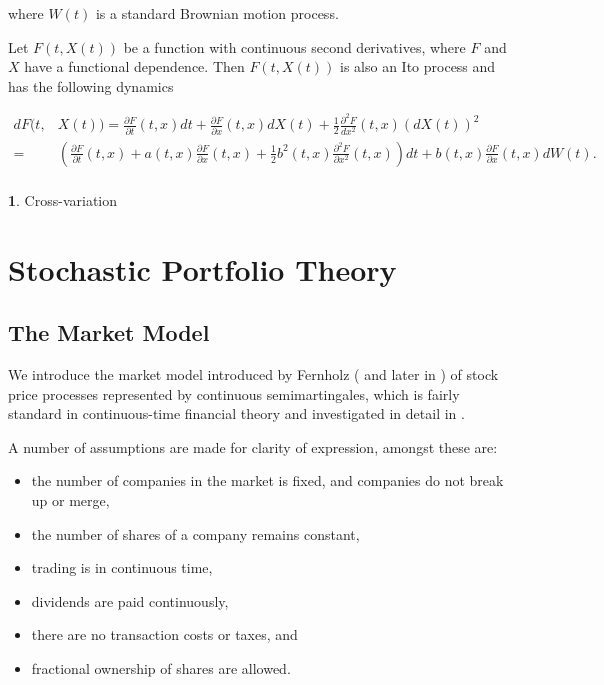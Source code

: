 \documentclass[british]{amsart} \usepackage{lmodern}
\numberwithin{equation}{section} \numberwithin{figure}{section}
\theoremstyle{plain} \newtheorem{thm}{\protect\theoremname}[section]
\theoremstyle{definition} \newtheorem{defn}[thm]{\protect\definitionname}
\theoremstyle{plain} \newtheorem{assumption}[thm]{\protect\assumptionname}
\theoremstyle{plain} \newtheorem{lem}[thm]{\protect\lemmaname}
\theoremstyle{plain} \newtheorem{prop}[thm]{\protect\propositionname}
\theoremstyle{remark} \newtheorem{rem}[thm]{\protect\remarkname}
\theoremstyle{plain} \newtheorem{cor}[thm]{\protect\corollaryname}
\begin{document}
where $W(t)$ is a standard Brownian motion process.

Let $F(t,X(t))$ be a function with continuous second derivatives,
where $F$ and $X$ have a functional dependence. Then $F(t,X(t))$
is also an Ito process and has the following dynamics

\begin{align*}
dF(t, & X(t))=\frac{\partial F}{\partial t}(t,x)dt+\frac{\partial F}{\partial x}(t,x)dX(t)+\frac{1}{2}\frac{\partial^{2}F}{dx^{2}}(t,x)(dX(t))^{2}\\
= & \left(\frac{\partial F}{\partial t}(t,x)+a(t,x)\frac{\partial F}{\partial x}(t,x)+\frac{1}{2}b^{2}(t,x)\frac{\partial^{2}F}{\partial x^{2}}(t,x)\right)dt+b(t,x)\frac{\partial F}{\partial x}(t,x)dW(t).\\
\end{align*}

\begin{defn}
Cross-variation 
\end{defn}



\newpage

\section{Stochastic Portfolio Theory}

\subsection{The Market Model}

We introduce the market model introduced by Fernholz (\cite{fernholz1999pgf} and
later in \cite{fernholz2009}) of stock price processes represented by continuous
semimartingales, which is fairly standard in continuous-time financial theory
and investigated in detail in \cite{karatzas1998}.

A number of assumptions are made for clarity of expression, amongst these are:

\begin{itemize}
  \item the number of companies in the market is fixed, and companies do not 
        break up or merge,
  \item the number of shares of a company remains constant,
  \item trading is in continuous time,
  \item dividends are paid continuously,
  \item there are no transaction costs or taxes, and
  \item fractional ownership of shares are allowed.
\end{itemize}
\end{document}
